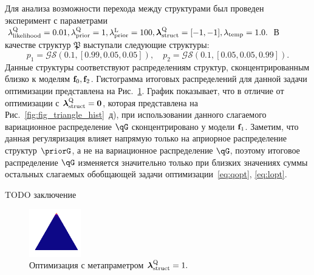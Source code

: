 Для анализа возможности перехода между структурами был проведен эксперимент с параметрами 
$\lambda_\text{likelihood}^\text{Q} = 0.01, \lambda_\text{prior}^\text{Q} = 1, \lambda_\text{prior}^\text{L} = 100, \boldsymbol{\lambda}_\text{struct}^\text{Q} = [-1, -1], \lambda_{\text{temp}} = 1.0.$
В качестве структур $\mathfrak{P}$ выступали следующие структуры:
\[
    p_1  =  \mathcal{GS}(0.1, [0.99, 0.05, 0.05]), \quad p_2  =  \mathcal{GS}(0.1, [0.05, 0.05, 0.99]).
\]
Данные структуры соответствуют распределениям структур, сконцентрированным близко к моделям $\mathbf{f}_0, \mathbf{f}_2$.
Гистограмма итоговых распределений для данной задачи оптимизации представлена на Рис.~\ref{fig:structure_comb_example}.
График показывает, что в отличие от оптимизации с $\boldsymbol{\lambda}_\text{struct}^\text{Q}=\mathbf{0}$, которая представлена на Рис.~\ref{fig:fig_triangle_hist}~д), при использовании данного слагаемого вариационное распределение $\qG$ сконцентрировано у модели $\mathbf{f}_1$.
Заметим, что данная регуляризация  влияет напрямую только на априорное распределение структур $\priorG$, а не на вариационное распределение $\qG$, поэтому итоговое распределение $\qG$ изменяется значительно только при близких значениях суммы остальных слагаемых обобщающей задачи оптимизации~\eqref{eq:qopt}, \eqref{eq:lopt}.


TODO заключение

\begin{figure}
\centering
\includegraphics[width=0.2\textwidth]{plots/experiment_structures/triangle_structure_comb.png}
\caption{Оптимизация с метапраметром $\boldsymbol{\lambda}_\text{struct}^\text{Q}=1.$}
\label{fig:structure_comb_example}
\end{figure}
